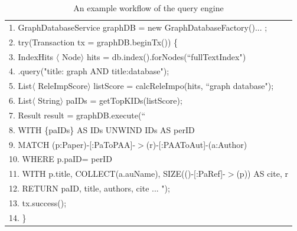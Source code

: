 \begin{table}[t!]
\caption{An example workflow of the query engine}
\vspace{-1ex}
\label{tab-workflow}
\begin{scriptsize}
\begin{tabular}{ l}
\hline
1. GraphDatabaseService graphDB = new GraphDatabaseFactory()... ; \\
2.  \hspace{0ex}  try(Transaction tx = graphDB.beginTx()) \{ \\
3.  \hspace{4ex} 	IndexHits $\langle$ Node$\rangle$ hits = db.index().forNodes(``fullTextIndex") \\
4.  \hspace{8ex}   .query("title: graph AND title:database"); \\
5.  \hspace{4ex} 	List$\langle$ ReleImpScore$\rangle$ listScore = calcReleImpo(hits, ``graph database"); \\
6.  \hspace{4ex} 	List$\langle$ String$\rangle$  paIDs = getTopKIDs(listScore); \\
7.  \hspace{4ex}    Result result = graphDB.execute(`` \\
8.  \hspace{8ex}		WITH \{paIDs\} AS IDs UNWIND IDs AS perID \\
9.  \hspace{8ex}		MATCH (p:Paper)-[:PaToPAA]-$>$(r)-[:PAAToAut]-(a:Author)\\
10.	\hspace{7ex}		WHERE p.paID= perID \\
11. \hspace{7ex}        WITH p.title,  COLLECT(a.auName), SIZE(()-[:PaRef]-$>$(p)) AS cite, r \\
12.	\hspace{7ex}		RETURN  paID, title, authors, cite ... ");\\
13.	\hspace{4ex}	    tx.success();\\
14. \hspace{2ex}  \} \\
\hline
\end{tabular} \\ %
\end{scriptsize}
\end{table}

